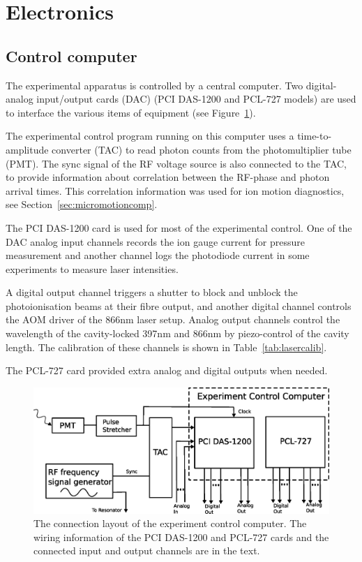 \section{Electronics}

\subsection{Control computer}

The experimental apparatus is controlled by a central computer. Two digital-analog input/output cards (DAC) (PCI DAS-1200 and PCL-727 models) are used to interface the various items of equipment (see Figure~\ref{fig:controlcomp}). 

The experimental control program running on this computer uses a time-to-amplitude converter (TAC) to read photon counts from the photomultiplier tube (PMT). The sync signal of the RF voltage source is also connected to the TAC, to provide information about correlation between the RF-phase and photon arrival times. This correlation information was used for ion motion diagnostics, see Section~\ref{sec:micromotioncomp}.

The PCI DAS-1200 card is used for most of the experimental control. One of the DAC analog input channels records the ion gauge current for pressure measurement and another channel logs the photodiode current in some experiments to measure laser intensities. 

A digital output channel triggers a shutter to block and unblock the photoionisation beams at their fibre output, and another digital channel controls the AOM driver of the 866nm laser setup. Analog output channels control the wavelength of the cavity-locked 397nm and 866nm by piezo-control of the cavity length. The calibration of these channels is shown in Table~\ref{tab:lasercalib}.

The PCL-727 card provided extra analog and digital outputs when needed.


\begin{figure}[h!t]
\centering
\includegraphics[width=13cm]{chapter4/computer/computer}
\caption[Experiment control computer connections]{The connection layout of the experiment control computer. The wiring information of the PCI DAS-1200 and PCL-727 cards and the connected input and output channels are in the text.}
\label{fig:controlcomp}
\end{figure} 



